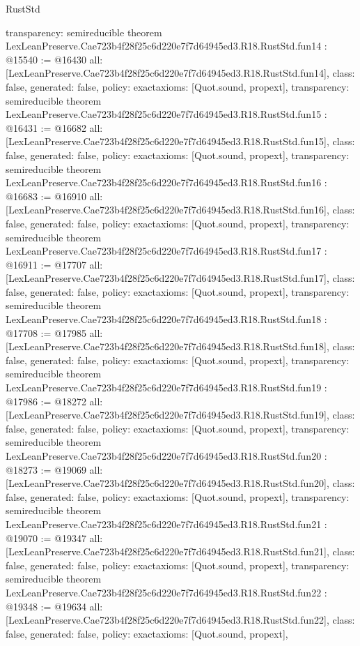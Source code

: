 \begin{lexlean}{RustStd}
\begin{coremodule}
{  transparency: semireducible
}
theorem LexLeanPreserve.Cae723b4f28f25c6d220e7f7d64945ed3.R18.RustStd.fun14 : @15540 := @16430 {
  all: [LexLeanPreserve.Cae723b4f28f25c6d220e7f7d64945ed3.R18.RustStd.fun14],
  class: false,
  generated: false,
  policy: exact{axioms: [Quot.sound, propext]},
  transparency: semireducible
}
theorem LexLeanPreserve.Cae723b4f28f25c6d220e7f7d64945ed3.R18.RustStd.fun15 : @16431 := @16682 {
  all: [LexLeanPreserve.Cae723b4f28f25c6d220e7f7d64945ed3.R18.RustStd.fun15],
  class: false,
  generated: false,
  policy: exact{axioms: [Quot.sound, propext]},
  transparency: semireducible
}
theorem LexLeanPreserve.Cae723b4f28f25c6d220e7f7d64945ed3.R18.RustStd.fun16 : @16683 := @16910 {
  all: [LexLeanPreserve.Cae723b4f28f25c6d220e7f7d64945ed3.R18.RustStd.fun16],
  class: false,
  generated: false,
  policy: exact{axioms: [Quot.sound, propext]},
  transparency: semireducible
}
theorem LexLeanPreserve.Cae723b4f28f25c6d220e7f7d64945ed3.R18.RustStd.fun17 : @16911 := @17707 {
  all: [LexLeanPreserve.Cae723b4f28f25c6d220e7f7d64945ed3.R18.RustStd.fun17],
  class: false,
  generated: false,
  policy: exact{axioms: [Quot.sound, propext]},
  transparency: semireducible
}
theorem LexLeanPreserve.Cae723b4f28f25c6d220e7f7d64945ed3.R18.RustStd.fun18 : @17708 := @17985 {
  all: [LexLeanPreserve.Cae723b4f28f25c6d220e7f7d64945ed3.R18.RustStd.fun18],
  class: false,
  generated: false,
  policy: exact{axioms: [Quot.sound, propext]},
  transparency: semireducible
}
theorem LexLeanPreserve.Cae723b4f28f25c6d220e7f7d64945ed3.R18.RustStd.fun19 : @17986 := @18272 {
  all: [LexLeanPreserve.Cae723b4f28f25c6d220e7f7d64945ed3.R18.RustStd.fun19],
  class: false,
  generated: false,
  policy: exact{axioms: [Quot.sound, propext]},
  transparency: semireducible
}
theorem LexLeanPreserve.Cae723b4f28f25c6d220e7f7d64945ed3.R18.RustStd.fun20 : @18273 := @19069 {
  all: [LexLeanPreserve.Cae723b4f28f25c6d220e7f7d64945ed3.R18.RustStd.fun20],
  class: false,
  generated: false,
  policy: exact{axioms: [Quot.sound, propext]},
  transparency: semireducible
}
theorem LexLeanPreserve.Cae723b4f28f25c6d220e7f7d64945ed3.R18.RustStd.fun21 : @19070 := @19347 {
  all: [LexLeanPreserve.Cae723b4f28f25c6d220e7f7d64945ed3.R18.RustStd.fun21],
  class: false,
  generated: false,
  policy: exact{axioms: [Quot.sound, propext]},
  transparency: semireducible
}
theorem LexLeanPreserve.Cae723b4f28f25c6d220e7f7d64945ed3.R18.RustStd.fun22 : @19348 := @19634 {
  all: [LexLeanPreserve.Cae723b4f28f25c6d220e7f7d64945ed3.R18.RustStd.fun22],
  class: false,
  generated: false,
  policy: exact{axioms: [Quot.sound, propext]},
}
\end{coremodule}
\end{lexlean}
